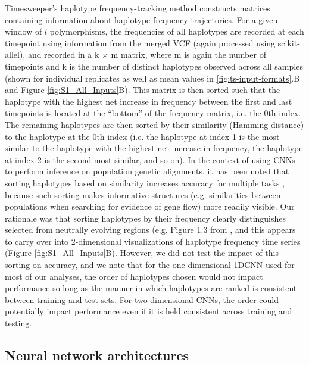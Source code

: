 Timesweeper’s haplotype frequency-tracking method constructs matrices containing information about haplotype frequency trajectories. For a given window of $l$ polymorphisms, the frequencies of all haplotypes are recorded at each timepoint using information from the merged VCF (again processed using scikit-allel), and recorded in a k × m matrix, where m is again the number of timepoints and k is the number of distinct haplotypes observed across all samples (shown for individual replicates as well as mean values in \ref{fig:ts-input-formats}.B and Figure \ref{fig:S1_All_Inputs}B). This matrix is then sorted such that the haplotype with the highest net increase in frequency between the first and last timepoints is located at the “bottom” of the frequency matrix, i.e. the 0th index. The remaining haplotypes are then sorted by their similarity (Hamming distance) to the haplotype at the 0th index (i.e. the haplotype at index 1 is the most similar to the haplotype with the highest net increase in frequency, the haplotype at index 2 is the second-most similar, and so on). In the context of using CNNs to perform inference on population genetic alignments, it has been noted that sorting haplotypes based on similarity increases accuracy for multiple tasks \cite{flagelUnreasonableEffectivenessConvolutional2019,rayIntroUNETIdentifyingIntrogressed2023}, because such sorting makes informative structures (e.g. similarities between populations when searching for evidence of gene flow) more readily visible. Our rationale was that sorting haplotypes by their frequency clearly distinguishes selected from neutrally evolving regions (e.g. Figure 1.3 from \cite{garudRecentSelectiveSweeps2015}, and this appears to carry over into 2-dimensional visualizations of haplotype frequency time series (Figure \ref{fig:S1_All_Inputs}B). However, we did not test the impact of this sorting on accuracy, and we note that for the one-dimensional 1DCNN used for most of our analyses, the order of haplotypes chosen would not impact performance so long as the manner in which haplotypes are ranked is consistent between training and test sets. For two-dimensional CNNs, the order could potentially impact performance even if it is held consistent across training and testing. \\

\subsection{Neural network architectures}

